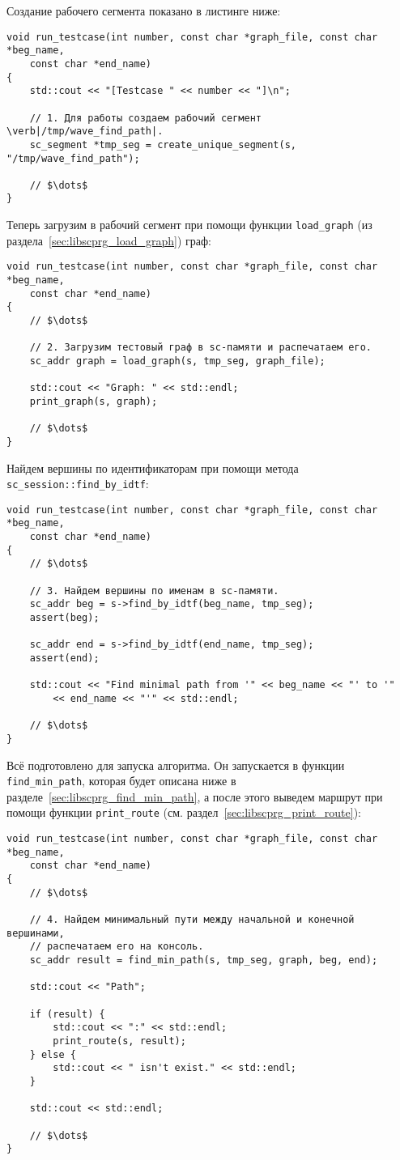 Создание рабочего сегмента показано в листинге ниже:
\begin{lstlisting}[texcl]
void run_testcase(int number, const char *graph_file, const char *beg_name,
    const char *end_name)
{
    std::cout << "[Testcase " << number << "]\n";

    // 1. Для работы создаем рабочий сегмент \verb|/tmp/wave_find_path|.
    sc_segment *tmp_seg = create_unique_segment(s, "/tmp/wave_find_path");

    // $\dots$
}
\end{lstlisting}

Теперь загрузим в рабочий сегмент при помощи функции
\lstinline|load_graph| (из раздела~\ref{sec:libscprg_load_graph})
граф:
\begin{lstlisting}[texcl]
void run_testcase(int number, const char *graph_file, const char *beg_name,
    const char *end_name)
{
    // $\dots$

    // 2. Загрузим тестовый граф в sc-памяти и распечатаем его.
    sc_addr graph = load_graph(s, tmp_seg, graph_file);

    std::cout << "Graph: " << std::endl;
    print_graph(s, graph);

    // $\dots$
}
\end{lstlisting}

Найдем вершины по идентификаторам при помощи метода
\lstinline|sc_session::find_by_idtf|:
\begin{lstlisting}[texcl]
void run_testcase(int number, const char *graph_file, const char *beg_name,
    const char *end_name)
{
    // $\dots$

    // 3. Найдем вершины по именам в sc-памяти.
    sc_addr beg = s->find_by_idtf(beg_name, tmp_seg);
    assert(beg);

    sc_addr end = s->find_by_idtf(end_name, tmp_seg);
    assert(end);

    std::cout << "Find minimal path from '" << beg_name << "' to '"
        << end_name << "'" << std::endl;

    // $\dots$
}
\end{lstlisting}

Всё подготовлено для запуска алгоритма. Он запускается в функции
\lstinline|find_min_path|, которая будет описана ниже в
разделе~\ref{sec:libscprg_find_min_path}, а после этого выведем
маршрут при помощи функции \lstinline|print_route|
(см. раздел~\ref{sec:libscprg_print_route}):
\begin{lstlisting}[texcl]
void run_testcase(int number, const char *graph_file, const char *beg_name,
    const char *end_name)
{
    // $\dots$

    // 4. Найдем минимальный пути между начальной и конечной вершинами,
    // распечатаем его на консоль.
    sc_addr result = find_min_path(s, tmp_seg, graph, beg, end);

    std::cout << "Path";

    if (result) {
        std::cout << ":" << std::endl;
        print_route(s, result);
    } else {
        std::cout << " isn't exist." << std::endl;
    }

    std::cout << std::endl;

    // $\dots$
}
\end{lstlisting}

